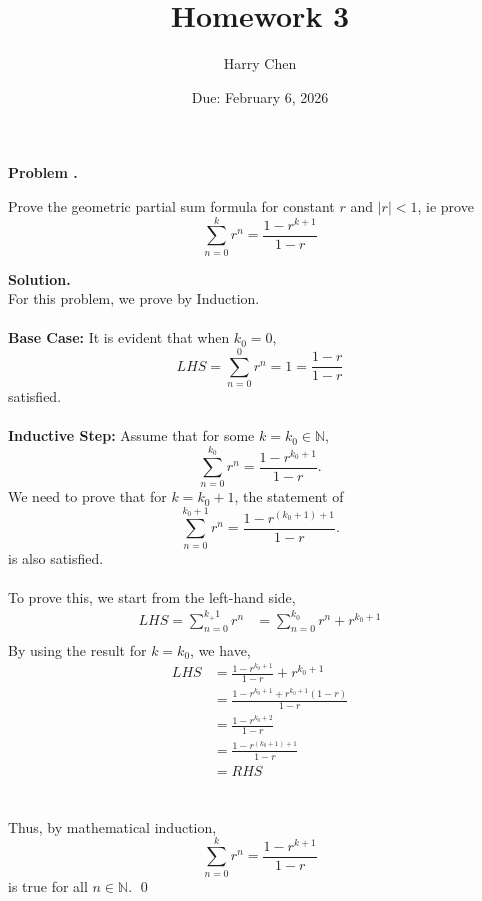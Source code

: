 \documentclass[12pt]{article}
\newcounter{HWcounter}
\newcommand{\problem}{\textbf{Problem  \theHWcounter.} \addtocounter{HWcounter}{1}}
\newcommand{\answer}{\vspace{2em} \textbf{Solution. }}
\newcommand{\N}{\mathbb{N}} %
\begin{document}
\title{Homework 3}
\author{Harry Chen}
\date{Due: February 6, 2026} %
\maketitle





\problem Prove the geometric partial sum formula for constant $r$ and $|r|<1$, ie prove 
\[ \sum_{n=0}^k r^n = \dfrac{1 - r^{k+1}}{1-r} \]

\answer  %
\\
For this problem, we prove by Induction. 
\\
\\
\textbf{Base Case: } It is evident that when $ k_0=0$,  
\[ LHS = \sum_{n=0}^0 r^n = 1 = \dfrac{1 - r}{1-r}  \]
satisfied.\\
\\
\textbf{Inductive Step: }
Assume that for some $k=k_0\in \N$,
\[
\sum_{n=0}^{k_0} r^n = \frac{1 - r^{k_0+1}}{1 - r}.
\]
We need to prove that for $k=k_0+1$, the statement of
\[
\sum_{n=0}^{k_0+1} r^n = \frac{1 - r^{(k_0+1)+1}}{1 - r}.
\]
is also satisfied.
\\
\vspace*{2cm}
\\
To prove this, we start from the left-hand side,
\begin{align}
LHS = \sum_{n=0}^{k_+1} r^n
&= \sum_{n=0}^{k_0} r^n + r^{k_0+1} \\
\end{align}
By using the result for $k=k_0$, we have,
\begin{align}
LHS 
&= \frac{1 - r^{k_0+1}}{1 - r} + r^{k_0+1} \\
&= \frac{1 - r^{k_0+1} + r^{k_0+1}(1 - r)}{1 - r} \\
&= \frac{1 - r^{k_0+2}}{1 - r}\\
&= \frac{1 - r^{(k_0+1)+1}}{1 - r}\\
&=RHS
\end{align}
\\
\\
Thus, by mathematical induction, 
\[ \sum_{n=0}^k r^n = \dfrac{1 - r^{k+1}}{1-r} \]
is true for all $n \in \N$.
\qed
\end{document}
